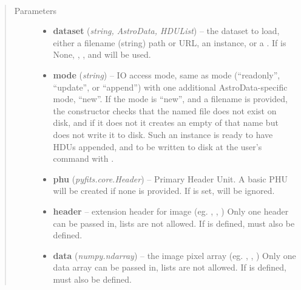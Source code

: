\documentclass[letterpaper,10pt,english]{sphinxmanual}
\begin{document}
\begin{fulllineitems}
\label{chapter_AstroDataClass:astrodata.data.AstroData.__init__}~\begin{quote}\begin{description}
\item[{Parameters}] \leavevmode\begin{itemize}
\item {} 
\textbf{dataset} (\emph{string, AstroData, HDUList}) -- the dataset to load, either a filename (string) path
or URL, an  instance, or a . If 
 is None, , , and  will be used.

\item {} 
\textbf{mode} (\emph{string}) -- IO access mode, same as  mode (``readonly'', ``update'',
or ``append'') with one additional AstroData-specific mode, ``new''.
If the mode is ``new'', and a filename is provided, the constructor
checks that the named file does not exist on disk,
and if it does not it creates an empty  of that name 
but does not write it to disk. Such an  
instance is ready to have HDUs appended, and to be written to disk
at the user's command with .

\item {} 
\textbf{phu} (\emph{pyfits.core.Header}) -- Primary Header Unit.  A basic PHU will be created if none
is provided.  If  is set,  will be ignored.

\item {} 
\textbf{header} -- extension header for image (eg. ,
, )
Only one header can be passed in, lists are not allowed.
If  is defined,  must also be defined.

\item {} 
\textbf{data} (\emph{numpy.ndarray}) -- the image pixel array (eg. ,
, )
Only one data array can be passed in, lists are not allowed.
If  is defined,  must also be defined.


\end{itemize}
\end{description}
\end{quote}
\end{fulllineitems}
\end{document}
